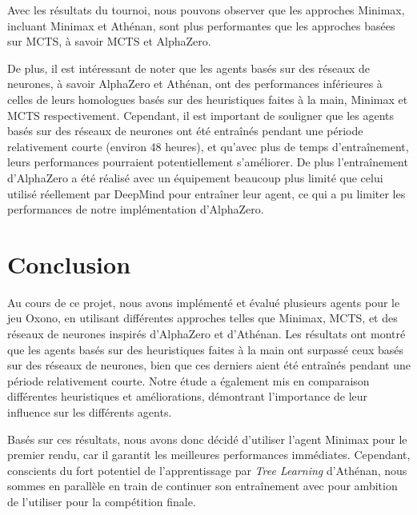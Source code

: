 \documentclass[a4paper,11pt]{article}
\begin{document}
Avec les résultats du tournoi, nous pouvons observer que les approches Minimax, incluant Minimax et Athénan, sont plus performantes que les approches basées sur MCTS, à savoir MCTS et AlphaZero.

De plus, il est intéressant de noter que les agents basés sur des réseaux de neurones, à savoir AlphaZero et Athénan, ont des performances inférieures à celles de leurs homologues basés sur des heuristiques faites à la main, Minimax et MCTS respectivement. Cependant, il est important de souligner que les agents basés sur des réseaux de neurones ont été entraînés pendant une période relativement courte (environ 48 heures), et qu'avec plus de temps d'entraînement, leurs performances pourraient potentiellement s'améliorer. De plus l'entraînement d'AlphaZero a été réalisé avec un équipement beaucoup plus limité que celui utilisé réellement par DeepMind pour entraîner leur agent, ce qui a pu limiter les performances de notre implémentation d'AlphaZero.

\section{Conclusion}
Au cours de ce projet, nous avons implémenté et évalué plusieurs agents pour le jeu Oxono, en utilisant différentes approches telles que Minimax, MCTS, et des réseaux de neurones inspirés d'AlphaZero et d'Athénan. Les résultats ont montré que les agents basés sur des heuristiques faites à la main ont surpassé ceux basés sur des réseaux de neurones, bien que ces derniers aient été entraînés pendant une période relativement courte. Notre étude a également mis en comparaison différentes heuristiques et améliorations, démontrant l'importance de leur influence sur les différents agents.

Basés sur ces résultats, nous avons donc décidé d'utiliser l'agent Minimax pour le premier rendu, car il garantit les meilleures performances immédiates. Cependant, conscients du fort potentiel de l'apprentissage par \textit{Tree Learning} d'Athénan, nous sommes en parallèle en train de continuer son entraînement avec pour ambition de l'utiliser pour la compétition finale.

\newpage



\end{document}
